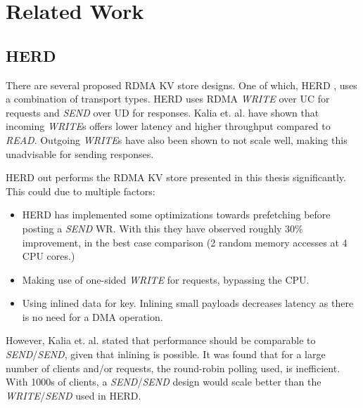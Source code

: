 
\chapter{Related Work}\label{ch:related-work} %



\ifpdf
    \graphicspath{{7/figures/PNG/}{7/figures/PDF/}{7/figures/}}
\else
    \graphicspath{{7/figures/EPS/}{7/figures/}}
\fi


%
\section{HERD}
There are several proposed RDMA KV store designs.
One of which, HERD \cite{kalia2014using}, uses a combination of transport types.
HERD uses RDMA \textit{WRITE} over UC for requests and \textit{SEND} over UD for responses.
Kalia et. al. have shown that incoming \textit{WRITE}s offers lower latency and higher throughput compared to \textit{READ}.
Outgoing \textit{WRITE}s have also been shown to not scale well, making this unadvisable for sending responses.

HERD out performs the RDMA KV store presented in this thesis significantly.
This could due to multiple factors:
\begin{itemize}
    \item HERD has implemented some optimizations towards prefetching before posting a \textit{SEND} WR.
    With this they have observed roughly 30\% improvement, in the best case comparison (2 random memory accesses at 4 CPU cores.)
    \item Making use of one-sided \textit{WRITE} for requests, bypassing the CPU.
    \item Using inlined data for key.
    Inlining small payloads decreases latency as there is no need for a DMA operation.
\end{itemize}

However, Kalia et. al. stated that performance should be comparable to \textit{SEND}/\textit{SEND}, given that inlining is possible.
It was found that for a large number of clients and/or requests, the round-robin polling used, is inefficient.
With 1000s of clients, a \textit{SEND}/\textit{SEND} design would scale better than the \textit{WRITE}/\textit{SEND} used in HERD.




